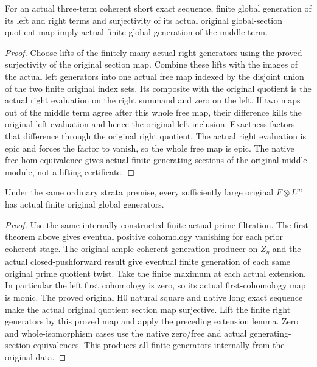 \begin{lemma}
\label{lem:seshadri-original-extension-global-generators}
For an actual three-term coherent short exact sequence, finite global
generation of its left and right terms and surjectivity of its actual
original global-section quotient map imply actual finite global
generation of the middle term.
\end{lemma}
\begin{proof}
Choose lifts of the finitely many actual right generators using the
proved surjectivity of the original section map. Combine these lifts
with the images of the actual left generators into one actual free
map indexed by the disjoint union of the two finite original index sets.
Its composite with the original quotient is the actual right evaluation
on the right summand and zero on the left. If two maps out of the
middle term agree after this whole free map, their difference kills the
original left evaluation and hence the original left inclusion. Exactness
factors that difference through the original right quotient. The actual
right evaluation is epic and forces the factor to vanish, so the whole
free map is epic. The native free-hom equivalence gives actual finite
generating sections of the original middle module, not a lifting certificate.
\end{proof}

\begin{theorem}
\label{thm:seshadri-original-strata-coherent-generators}
\leanok
Under the same ordinary strata premise, every sufficiently large
original $F\otimes L^m$ has actual finite original global generators.
\end{theorem}
\begin{proof}
Use the same internally constructed finite actual prime filtration.
The first theorem above gives eventual positive cohomology vanishing
for each prior coherent stage. The original ample coherent generation
producer on $Z_\eta$ and the actual closed-pushforward result give
eventual finite generation of each same original prime quotient twist.
Take the finite maximum at each actual extension. In particular the
left first cohomology is zero, so its actual first-cohomology map is
monic. The proved original H0 natural square and native long exact
sequence make the actual original quotient section map surjective.
Lift the finite right generators by this proved map and apply the
preceding extension lemma. Zero and whole-isomorphism cases use the
native zero/free and actual generating-section equivalences. This produces
all finite generators internally from the original data.
\end{proof}


